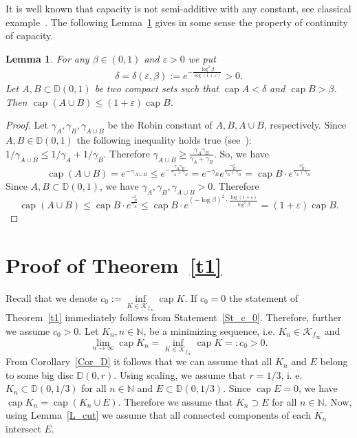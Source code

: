 \documentclass[12pt]{article}
\newtheorem{Lemma}{Lemma}
\def\NN{\mathbb N}
\def\DD{\mathbb D}
\def\KKf{\mathcal K_{f_\infty}}
\def\mcap{\operatorname{cap}}
\begin{document}
It is well known that capacity is not semi-additive with any constant, see classical example~\cite[Corollary~5.2.6]{Ra95}. 
The following Lemma~\ref{L_cap} gives in some sense the property of continuity of capacity.

\begin{Lemma}
\label{L_cap}
For any $\beta\in(0,1)$ and $\varepsilon>0$ we put 
\begin{equation*}
\delta=\delta(\varepsilon,\beta):=e^{-\frac{\log^2\beta}{\log{(1+\varepsilon)}}}>0.
\end{equation*}
Let $A, B\subset\DD(0,1)$ be two compact sets such that $\mcap A<\delta$ and $\mcap B>\beta$. Then $\mcap(A\cup B)\leqslant (1+\varepsilon)\mcap B$.
\end{Lemma}
\begin{proof}
Let $\gamma_A,\gamma_B,\gamma_{A\cup B}$ be the Robin constant of $A, B, A\cup B$, respectively. Since $A, B\in\DD(0,1)$ the following inequality holds true (see~\cite[Theorem~5.1.4]{Ra95}): $1/\gamma_{A\cup B}\leq1/\gamma_A+1/\gamma_B$. Therefore $\gamma_{A\cup B}\geq \frac{\gamma_A\gamma_B}{\gamma_A+\gamma_B}$. So, we have
\begin{equation*}
\mcap (A\cup B)=e^{-\gamma_{A\cup B}}\leq e^{-\frac{\gamma_A\gamma_B}{\gamma_A+\gamma_B}}=e^{-\gamma_B}e^{\frac{\gamma_B^2}{\gamma_A+\gamma_B}}=\mcap B\cdot e^{\frac{\gamma_B^2}{\gamma_A+\gamma_B}}
\end{equation*}
Since $A, B\subset\DD(0,1)$, we have $\gamma_A,\gamma_B,\gamma_{A\cup B}>0$. Therefore
\begin{equation*}
\mcap (A\cup B)\leq\mcap B\cdot e^{\frac{\gamma_B^2}{\gamma_A}}\leq \mcap B\cdot e^{(-\log \beta)^2\cdot\frac{\log(1+\varepsilon)}{\log^2\beta}}=(1+\varepsilon)\mcap B.
\end{equation*}
\end{proof}




\section{Proof of Theorem~\ref{t1}}
\label{s4}

Recall that we denote $c_0:=\inf\limits_{K\in\KKf}\mcap K$. If $c_0=0$ the statement of Theorem~\ref{t1} immediately follows from Statement~\ref{St_c_0}. Therefore, further we assume $c_0>0$.
Let $K_n, n\in\NN$, be a minimizing sequence, i.e. $K_n\in\KKf$ and
\begin{equation}
\label{c_00}
\lim_{n\to\infty}\mcap K_n = \inf\limits_{K\in\KKf}\mcap K =: c_0>0.
\end{equation}
From Corollary~\ref{Cor_D} it follows that we can assume that all $K_n$ and $E$ belong to some big disc $\DD(0,r)$. Using scaling, we assume that $r=1/3$, i. e. $K_n\subset\DD(0,1/3)$ for all $n\in\NN$ and $E\subset\DD(0,1/3)$. 
Since $\mcap E=0$, we have $\mcap K_n=\mcap(K_n\cup E)$. Therefore we assume that $K_n\supset E$ for all $n\in\NN$. Now, using Lemma~\ref{L_cut} we assume that all connected components of each $K_n$ intersect $E$.
\end{document}
